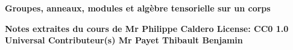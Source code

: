 \begin{titlepage}
	\begin{center}\bfseries\Huge
		Groupes, anneaux, modules et alg\`{e}bre tensorielle sur un corps
	\end{center}
	\hrulefill
	\vspace*{1cm}
	\begin{center}\bfseries\Large
		Notes extraites du cours de Mr Philippe Caldero \newline
		License: CC0 1.0 Universal \newline
		Contributeur(s) \newline
		Mr Payet Thibault Benjamin
	\end{center}
\end{titlepage}

